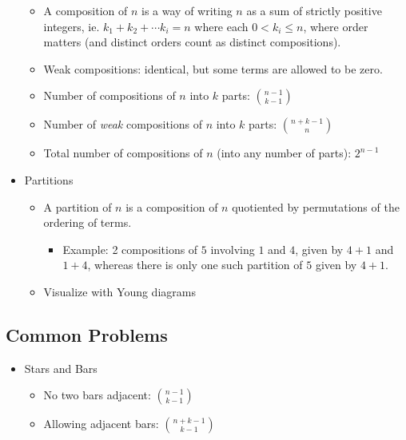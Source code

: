 \begin{itemize}
  \begin{itemize}
  \tightlist
  \item
    A composition of \(n\) is a way of writing \(n\) as a sum of
    strictly positive integers, ie. \(k_1 + k_2 + \cdots k_i = n\) where
    each \(0 < k_i \leq n\), where order matters (and distinct orders
    count as distinct compositions).
  \item
    Weak compositions: identical, but some terms are allowed to be zero.
  \item
    Number of compositions of \(n\) into \(k\) parts:
    \(n-1 \choose k - 1\)
  \item
    Number of \emph{weak} compositions of \(n\) into \(k\) parts:
    \(n+k-1 \choose n\)
  \item
    Total number of compositions of \(n\) (into any number of parts):
    \(2^{n-1}\)
  \end{itemize}
\item
  Partitions

  \begin{itemize}
  \tightlist
  \item
    A partition of \(n\) is a composition of \(n\) quotiented by
    permutations of the ordering of terms.

    \begin{itemize}
    \tightlist
    \item
      Example: 2 compositions of \(5\) involving \(1\) and \(4\), given
      by \(4+1\) and \(1+4\), whereas there is only one such partition
      of \(5\) given by \(4+1\).
    \end{itemize}
  \item
    Visualize with Young diagrams
  \end{itemize}
\end{itemize}

\hypertarget{common-problems-1}{%
\subsection{Common Problems}\label{common-problems-1}}

\begin{itemize}
\tightlist
\item
  Stars and Bars

  \begin{itemize}
  \tightlist
  \item
    No two bars adjacent: \(n-1\choose k-1\)
  \item
    Allowing adjacent bars: \(n+k-1 \choose k-1\)
  \end{itemize}
\end{itemize}

